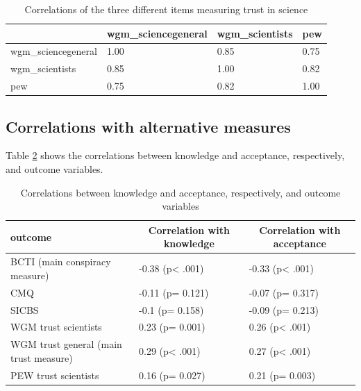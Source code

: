 \documentclass[
  doc,floatsintext]{apa6}
\begin{document}
\begin{table}[h]

\begin{center}
\begin{threeparttable}

\caption{\label{tab:correlation-trust}Correlations of the three different items measuring trust in science}

\begin{tabular}{llll}
\toprule
 & \multicolumn{1}{c}{wgm\_sciencegeneral} & \multicolumn{1}{c}{wgm\_scientists} & \multicolumn{1}{c}{pew}\\
\midrule
wgm\_sciencegeneral & 1.00 & 0.85 & 0.75\\
wgm\_scientists & 0.85 & 1.00 & 0.82\\
pew & 0.75 & 0.82 & 1.00\\
\bottomrule
\end{tabular}

\end{threeparttable}
\end{center}

\end{table}

\subsection{Correlations with alternative measures}\label{correlations-with-alternative-measures}

Table \ref{tab:correlations-outcomes} shows the correlations between knowledge and acceptance, respectively, and outcome variables.

\begin{table}[tbp]

\begin{center}
\begin{threeparttable}

\caption{\label{tab:correlations-outcomes}Correlations between knowledge and acceptance, respectively, and outcome variables}

\begin{tabular}{lll}
\toprule
outcome & \multicolumn{1}{c}{Correlation with knowledge} & \multicolumn{1}{c}{Correlation with acceptance}\\
\midrule
BCTI 
(main conspiracy measure) & -0.38 (p< .001) & -0.33 (p< .001)\\
CMQ & -0.11 (p= 0.121) & -0.07 (p= 0.317)\\
SICBS & -0.1 (p= 0.158) & -0.09 (p= 0.213)\\
WGM trust scientists & 0.23 (p= 0.001) & 0.26 (p< .001)\\
WGM trust general 
(main trust measure) & 0.29 (p< .001) & 0.27 (p< .001)\\
PEW trust scientists & 0.16 (p= 0.027) & 0.21 (p= 0.003)\\
\bottomrule
\end{tabular}

\end{threeparttable}
\end{center}

\end{table}
\end{document}
